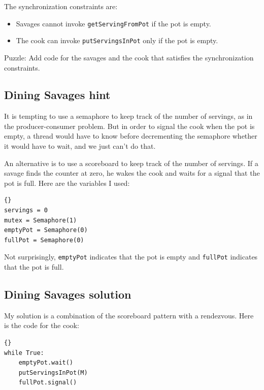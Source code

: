 \documentclass{book}
\begin{document}
The synchronization constraints are:

\begin{itemize}

    \item Savages cannot invoke {\tt getServingFromPot} if the
          pot is empty.

    \item The cook can invoke {\tt putServingsInPot} only if
          the pot is empty.

\end{itemize}

Puzzle: Add code for the savages and the cook that
satisfies the synchronization constraints.



\subsection{Dining Savages hint}

It is tempting to use a semaphore to keep track of the number of
servings, as in the producer-consumer problem.  But in order to signal
the cook when the pot is empty, a thread would have to know before
decrementing the semaphore whether it would have to wait, and we just
can't do that.

An alternative is to use a scoreboard to
keep track of the number of servings.  If a savage finds
the counter at zero, he wakes the cook and waits for a signal
that the pot is full.  Here are the variables I used:

\begin{lstlisting}[title={Dining Savages hint}]{}
servings = 0
mutex = Semaphore(1)
emptyPot = Semaphore(0)
fullPot = Semaphore(0)
\end{lstlisting}

Not surprisingly, {\tt emptyPot} indicates that the pot is empty and
    {\tt fullPot} indicates that the pot is full.


\subsection{Dining Savages solution}

My solution is a combination of the scoreboard pattern
with a rendezvous.
Here is the code for the cook:

\begin{lstlisting}[title={Dining Savages solution (cook)}]{}
while True:
    emptyPot.wait()
    putServingsInPot(M)
    fullPot.signal()
\end{lstlisting}
\end{document}
